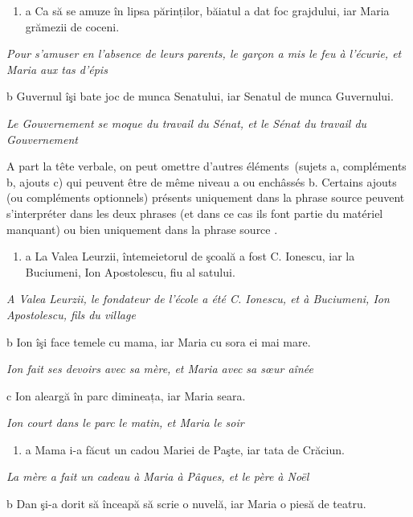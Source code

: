 \begin{enumerate}
\item \label{bkm:Ref289332014}a  Ca să se amuze în lipsa părinților, băiatul a dat foc grajdului, iar Maria grămezii de coceni.


\end{enumerate}
{\itshape
Pour s'amuser en l'absence de leurs parents, le garçon a mis le feu à l'écurie, et Maria aux tas d'épis  } 

  b  Guvernul îşi bate joc de munca Senatului, iar Senatul de munca Guvernului.

{\itshape
Le Gouvernement se moque du travail du Sénat, et le Sénat du travail du Gouvernement}

A part la tête verbale, on peut omettre d'autres éléments~(sujets a, compléments b, ajouts c) qui peuvent être de même niveau a ou enchâssés b. Certains ajouts (ou compléments optionnels) présents uniquement dans la phrase source peuvent s'interpréter dans les deux phrases (et dans ce cas ils font partie du matériel manquant) ou bien uniquement dans la phrase source . 


\begin{enumerate}
\item \label{bkm:Ref289286824}a  La Valea Leurzii, întemeietorul de şcoală a fost C. Ionescu, iar la Buciumeni, Ion Apostolescu, fiu al satului.


\end{enumerate}
{\itshape
A Valea Leurzii, le fondateur de l'école a été C. Ionescu, et à Buciumeni, Ion Apostolescu, fils du village}

  b  Ion îşi face temele cu mama, iar Maria cu sora ei mai mare.

{\itshape
Ion fait ses devoirs avec sa mère, et Maria avec sa s{\oe}ur aînée  } 

  c  Ion aleargă în parc dimineața, iar Maria seara.

    \textit{Ion court dans le parc le matin, et Maria le soir}


\begin{enumerate}
\item \label{bkm:Ref289286797}a  Mama i-a făcut un cadou Mariei de Paşte, iar tata de Crăciun.


\end{enumerate}
{\itshape
La mère a fait un cadeau à Maria à Pâques, et le père à Noël}

  b  Dan şi-a dorit să înceapă să scrie o nuvelă, iar Maria o piesă de teatru.

